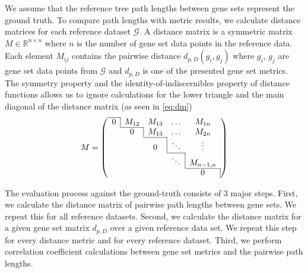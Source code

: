 \documentclass{thesisclass}
\begin{document}
We assume that the reference tree path lengths between gene sets represent the ground truth. 
To compare path lengths with metric results, we calculate distance matrices for each reference dataset $\mathcal{G}$.
A distance matrix is a symmetric matrix $M \in \mathbb{R}^{n \times n}$ where $n$ is the number of gene set data points in the reference data.
Each element $M_{ij}$ contains the pairwise distance $d_{p, D}(g_i,g_j)$ where $g_i$, $g_j$ are gene set data points from  $\mathcal{G}$ and $d_{p, D}$ is one of the presented gene set metrics. 
The symmetry property and the identity-of-indiscernibles property of distance functions allows us to ignore calculations for the lower triangle and the main diagonal of the distance matrix (as seen in \cref{eq:dm})
\begin{equation} \label{eq:dm}
   M = \left(
   \begin{array}{ccccc}
    \cline{1-1}
    \multicolumn{1}{c|}{0} &                  M_{12}     &                        M_{13} & \ldots                                  & M_{1n} \\ \cline{2-2}
                                   &  \multicolumn{1}{c|}{0} &                        M_{13} & \ldots                                  & M_{2n} \\  \cline{3-3}
                                    &                                  & \multicolumn{1}{c|}{0} & \ddots                                 & \vdots  \\ \cline{4-4}
                                    &                                   &                                  &  \multicolumn{1}{c|}{\ddots} & M_{n-1,n} \\ \cline{5-5}
                                    &                                   &                                  &                                             & \multicolumn{1}{c|}{0} \\ 
  \end{array}\right)
\end{equation}


The evaluation process against the ground-truth consists of 3 major steps.
First, we calculate the distance matrix of pairwise path lengths between gene sets. 
We repeat this for all reference datasets. 
Second, we calculate the distance matrix for a given gene set matrix $d_{p,D}$ over a given reference data set.
We repeat this step for every distance metric and for every reference dataset.
Third, we perform correlation coefficient calculations between gene set metrics and the pairwise path lengths.
\end{document}
